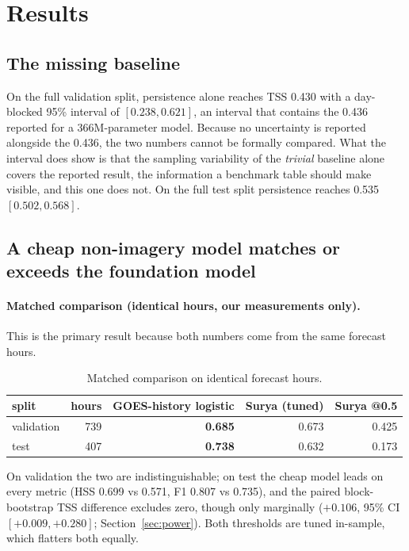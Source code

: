 \documentclass[11pt]{article}
\begin{document}
\section{Results}

\subsection{The missing baseline}

On the full validation split, persistence alone reaches TSS 0.430 with a
day-blocked 95\% interval of $\mathbf{[0.238, 0.621]}$, an interval that
contains the 0.436 reported for a 366M-parameter model. Because no uncertainty is reported
alongside the 0.436, the two numbers cannot be formally compared. What the
interval does show is that the sampling variability of the \emph{trivial}
baseline alone covers the reported result, the information a benchmark table
should make visible, and this one does not. On the full test split persistence reaches
0.535 $[0.502, 0.568]$.

\subsection{A cheap non-imagery model matches or exceeds the foundation model}
\label{sec:cheap}

\paragraph{Matched comparison (identical hours, our measurements only).} This is
the primary result because both numbers come from the same forecast hours.

\begin{table}[htbp]
\centering
\caption{Matched comparison on identical forecast hours.}
\begin{tabular}{lrrrr}
\toprule
split & hours & GOES-history logistic & Surya (tuned) & Surya @0.5 \\
\midrule
validation & 739 & \textbf{0.685} & 0.673 & 0.425 \\
test & 407 & \textbf{0.738} & 0.632 & 0.173 \\
\bottomrule
\end{tabular}
\end{table}

On validation the two are indistinguishable; on test the cheap model leads on
every metric (HSS 0.699 vs 0.571, F1 0.807 vs 0.735), and the paired
block-bootstrap TSS difference excludes zero, though only marginally ($+0.106$,
95\% CI $[+0.009, +0.280]$; Section~\ref{sec:power}). Both thresholds are tuned
in-sample, which flatters both equally.
\end{document}
